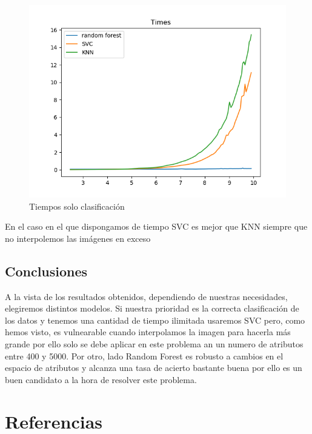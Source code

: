 \documentclass[8pt,a4paper]{{esannV2}}
\begin{document}
\begin{figure}[htbp]
\centering
    \includegraphics[scale=0.5]{./TiemposSoloClasificacion.png}
    \caption{Tiempos solo clasificación}
\end{figure}

En el caso en el que dispongamos de tiempo SVC es mejor que KNN siempre que no interpolemos las imágenes en exceso


\subsection{Conclusiones}
A la vista de los resultados obtenidos, dependiendo de nuestras necesidades, elegiremos distintos modelos. Si nuestra prioridad es la correcta clasificación de los datos y tenemos
una cantidad de tiempo ilimitada usaremos SVC pero, como hemos visto, es vulnearable cuando interpolamos la imagen para hacerla más grande por ello solo se debe aplicar en este problema an un numero de atributos entre 400 y 5000. Por otro, lado Random Forest es robusto a cambios en el espacio de atributos y alcanza una tasa de acierto bastante buena por ello es un buen candidato a la hora de resolver este problema. 

\section{Referencias}
\end{document}
